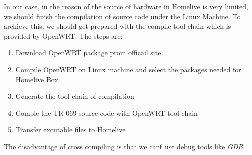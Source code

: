 In our case, in the reason of the source of hardware in Homelive is very limited, we should finish the compilation of source code under the Linux Machine. To archieve this, we should get prepared with the compile tool chain which is provided by OpenWRT. The steps are:

\begin{enumerate}
  \item Download OpenWRT package prom officail site
  \item Compile OpenWRT on Linux machine and select the packages needed for Homelive Box
  \item Generate the tool-chain of compilation
  \item Comple the TR-069 source code with OpenWRT tool chain
  \item Transfer excutable files to Homelive
\end{enumerate}

The disadvantage of cross compiling is that we can\'t use debug tools like \textit{GDB}.
